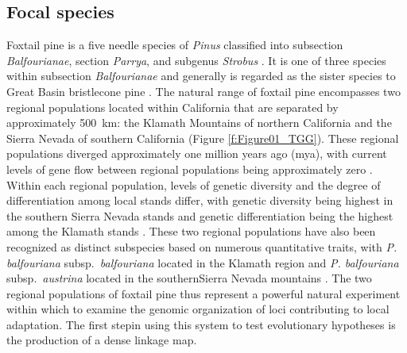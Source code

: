 \documentclass[11pt]{article}
\begin{document}
\subsection*{Focal species}
Foxtail pine is a five needle species of \textit{Pinus} classified into 
subsection \textit{Balfourianae}, section \textit{Parrya}, and subgenus \textit{Strobus} 
\citep{Gernandt:2005}. It is one of three species within subsection \textit{Balfourianae} 
\citep{Bailey:1970} and generally is regarded as the sister species to Great Basin bristlecone 
pine \citep[\textit{P. longaeva} D. K. Bailey; see][] {Eckert:2006a}. The natural range of foxtail pine encompasses two 
regional populations located within California that are separated by approximately \SI{500}{km}:  
the Klamath Mountains of northern California and the Sierra Nevada of southern California 
(Figure \ref{f:Figure01_TGG}). These regional populations diverged approximately one million years ago (mya), 
with current levels of gene flow between regional populations being approximately zero 
\citep{Eckert:2008}. Within each regional population, levels of genetic diversity and the 
degree of differentiation among local stands differ, with genetic diversity being highest in 
the southern Sierra Nevada stands and genetic differentiation being the highest among the 
Klamath stands \citep{Oline:2000, Eckert:2008}. These two regional populations
have also been recognized as distinct subspecies based on numerous quantitative traits, with \textit{P. balfouriana}
subsp.\ \textit{balfouriana} located in the Klamath region and \textit{P. balfouriana} subsp.\ \textit{austrina} located 
in the southernSierra Nevada mountains \citep{Mastrogiuseppe:1980}. The two regional populations of foxtail pine 
thus represent a powerful natural experiment within which to examine the genomic organization of loci contributing to 
local adaptation. The first stepin using this system to test evolutionary hypotheses is the production of a
dense linkage map.
\end{document}
